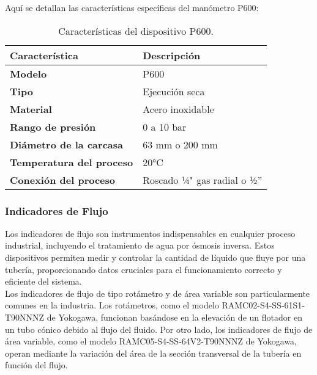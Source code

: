 Aquí se detallan las características específicas del manómetro P600:\\

\begin{table}[H]
    \centering
    \caption{Características del dispositivo P600.}
    \label{table:dispositivoP600}
    \begin{tabular}{| L{5cm} | L{5cm} |}
        \hline
        \textbf{Característica} & \textbf{Descripción}  \\
        \hline
        \textbf{Modelo} & P600  \\
        \hline
        \textbf{Tipo} & Ejecución seca  \\
        \hline
        \textbf{Material} & Acero inoxidable  \\
        \hline
        \textbf{Rango de presión} & 0 a 10 bar  \\
        \hline
        \textbf{Diámetro de la carcasa} & 63 mm o 200 mm  \\
        \hline
        \textbf{Temperatura del proceso} & 20°C  \\
        \hline
        \textbf{Conexión del proceso} & Roscado ¼" gas radial o ½''  \\
        \hline
    \end{tabular}
\end{table}


\subsubsection{Indicadores de Flujo}

Los indicadores de flujo son instrumentos indispensables en cualquier proceso industrial, incluyendo el tratamiento de agua por ósmosis inversa. Estos dispositivos permiten medir y controlar la cantidad de líquido que fluye por una tubería, proporcionando datos cruciales para el funcionamiento correcto y eficiente del sistema.\\

Los indicadores de flujo de tipo rotámetro y de área variable son particularmente comunes en la industria. Los rotámetros, como el modelo RAMC02-S4-SS-61S1-T90NNNZ de Yokogawa, funcionan basándose en la elevación de un flotador en un tubo cónico debido al flujo del fluido. Por otro lado, los indicadores de flujo de área variable, como el modelo RAMC05-S4-SS-64V2-T90NNNZ de Yokogawa, operan mediante la variación del área de la sección transversal de la tubería en función del flujo.\\

